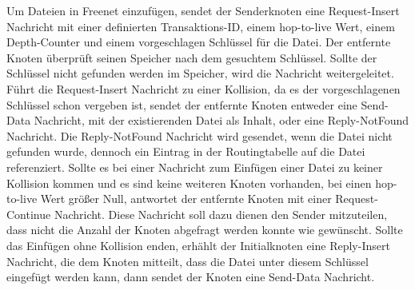 Um Dateien in Freenet einzufügen, sendet der Senderknoten eine Request-Insert
Nachricht mit einer definierten Transaktions-ID, einem hop-to-live Wert,
einem Depth-Counter und einem vorgeschlagen Schlüssel für die Datei. Der
entfernte Knoten überprüft seinen Speicher nach dem gesuchtem Schlüssel. Sollte
der Schlüssel nicht gefunden werden im Speicher, wird die Nachricht
weitergeleitet.
Führt die Request-Insert Nachricht zu einer Kollision, da es der
vorgeschlagenen Schlüssel schon vergeben ist, sendet der entfernte Knoten
entweder eine Send-Data Nachricht, mit der existierenden Datei als Inhalt, oder
eine Reply-NotFound Nachricht. Die Reply-NotFound Nachricht wird gesendet, wenn
die Datei nicht gefunden wurde, dennoch ein Eintrag in der Routingtabelle auf
die Datei referenziert.
Sollte es bei einer Nachricht zum Einfügen einer Datei zu keiner Kollision
kommen und es sind keine weiteren Knoten vorhanden, bei einen hop-to-live Wert
größer Null, antwortet der entfernte Knoten mit einer Request-Continue
Nachricht. Diese Nachricht soll dazu dienen den Sender mitzuteilen, dass nicht
die Anzahl der Knoten abgefragt werden konnte wie gewünscht.
Sollte das Einfügen ohne Kollision enden, erhählt der Initialknoten eine
Reply-Insert Nachricht, die dem Knoten mitteilt, dass die Datei unter diesem
Schlüssel eingefügt werden kann, dann sendet der Knoten eine Send-Data
Nachricht.
